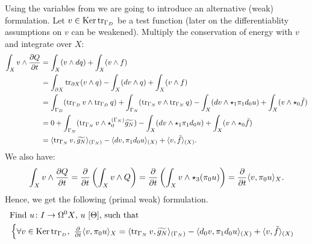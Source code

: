 \begin{discussion}
  Using the variables from
  we are going to introduce an alternative (weak) formulation.
  Let $v \in \mathop{\rm Ker}\nolimits \mathop{\rm tr}\nolimits_{\Gamma_D}$ be a test function
  (later on the differentiablity assumptions on $v$ can be weakened).
  Multiply the conservation of energy with $v$ and integrate over $X$:
  \begin{equation}
    \begin{split}
      \int_X v \wedge \frac{\partial Q}{\partial t}
      & = \int_X (v \wedge d q) + \int_X (v \wedge f) \\
      & = \int_{\partial X} \mathop{\rm tr}\nolimits_{\partial X} (v \wedge q)
        - \int_X (d v \wedge q)
        + \int_X (v \wedge f) \\
      & = \int_{\Gamma_D} (\mathop{\rm tr}\nolimits_{\Gamma_D} v \wedge \mathop{\rm tr}\nolimits_{\Gamma_D} q)
        + \int_{\Gamma_N} (\mathop{\rm tr}\nolimits_{\Gamma_N} v \wedge \mathop{\rm tr}\nolimits_{\Gamma_N} q)
        - \int_X (d v \wedge \star_1 \pi_1 d_0 u)
        + \int_X (v \wedge \star_0 \tilde{f}) \\
      & = 0
        + \int_{\Gamma_N}
          (\mathop{\rm tr}\nolimits_{\Gamma_N} v \wedge \star^{(\Gamma_N)}_0 \widetilde{g_N})
        - \int_X (d v \wedge \star_1 \pi_1 d_0 u)
        + \int_X (v \wedge \star_0 \tilde{f}) \\
      & = \langle\mathop{\rm tr}\nolimits_{\Gamma_N} v,\widetilde{g_N}\rangle_{(\Gamma_N)}
        - \langle d v,\pi_1 d_0 u\rangle_{(X)}
        + \langle v,\tilde{f}\rangle_{(X)}.
    \end{split}
  \end{equation}
  We also have:
  \begin{equation}
    \int_X v \wedge \frac{\partial Q}{\partial t}
    = \frac{\partial}{\partial t} \left(\int_X v \wedge Q\right)
    = \frac{\partial}{\partial t}
      \left(\int_X v \wedge \star_3 (\pi_0 u)\right)
    = \frac{\partial}{\partial t} \langle v,\pi_0 u\rangle_X.
  \end{equation}
  Hence, we get the following (primal weak) formulation.
  \begin{equation}
    \begin{split}
      & \text{Find $u \colon I \to \Omega^0 X$, $u\ [\Theta]$, such that} \\
      &
      \begin{cases}
        \forall v \in \mathop{\rm Ker}\nolimits \mathop{\rm tr}\nolimits_{\Gamma_D},\
          \frac{\partial}{\partial t} \langle v,\pi_0 u\rangle_X =
            \langle\mathop{\rm tr}\nolimits_{\Gamma_N} v,\widetilde{g_N}\rangle_{(\Gamma_N)}
          - \langle d_0 v,\pi_1 d_0 u\rangle_{(X)}
          + \langle v,\tilde{f}\rangle_{(X)} \\

\end{cases}
\end{split}
\end{equation}
\end{discussion}

